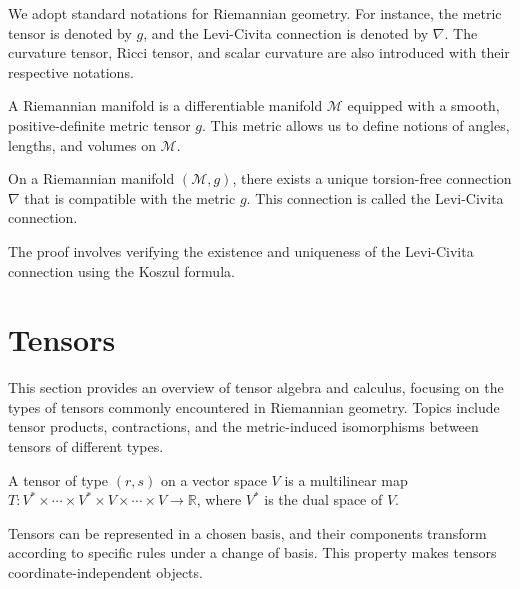 \begin{oobs}
We adopt standard notations for Riemannian geometry. For instance, the metric tensor is denoted by \( g \), and the Levi-Civita connection is denoted by \( \nabla \). The curvature tensor, Ricci tensor, and scalar curvature are also introduced with their respective notations.
\end{oobs}

\begin{deff}
A Riemannian manifold is a differentiable manifold \( \mathcal{M} \) equipped with a smooth, positive-definite metric tensor \( g \). This metric allows us to define notions of angles, lengths, and volumes on \( \mathcal{M} \).
\end{deff}

\begin{teorema}
On a Riemannian manifold \( (\mathcal{M}, g) \), there exists a unique torsion-free connection \( \nabla \) that is compatible with the metric \( g \). This connection is called the Levi-Civita connection.
\end{teorema}

\begin{demm}
The proof involves verifying the existence and uniqueness of the Levi-Civita connection using the Koszul formula.
\end{demm}

\section{Tensors}
\vspace{-0.7cm}
This section provides an overview of tensor algebra and calculus, focusing on the types of tensors commonly encountered in Riemannian geometry. Topics include tensor products, contractions, and the metric-induced isomorphisms between tensors of different types.

\begin{deff}
A tensor of type \( (r, s) \) on a vector space \( V \) is a multilinear map \( T: V^* \times \cdots \times V^* \times V \times \cdots \times V \to \mathbb{R} \), where \( V^* \) is the dual space of \( V \).
\end{deff}

\begin{oobs}
Tensors can be represented in a chosen basis, and their components transform according to specific rules under a change of basis. This property makes tensors coordinate-independent objects.
\end{oobs}

